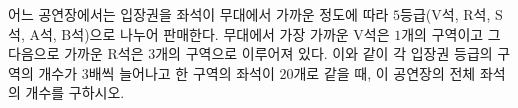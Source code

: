 어느 공연장에서는 입장권을 좌석이 무대에서 가까운 정도에 따라 $5$등급(V석, R석, S석, A석, B석)으로 나누어 판매한다. 무대에서 가장 가까운 V석은 $1$개의 구역이고 그 다음으로 가까운 R석은 $3$개의 구역으로 이루어져 있다. 이와 같이 각 입장권 등급의 구역의 개수가 $3$배씩 늘어나고 한 구역의 좌석이 $20$개로 같을 때, 이 공연장의 전체 좌석의 개수를 구하시오.
